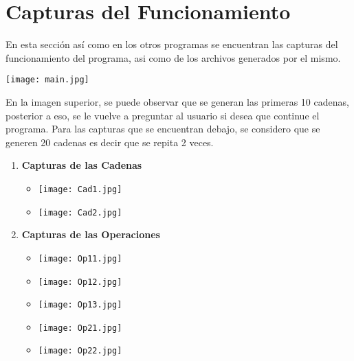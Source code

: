 \documentclass{article}
\begin{document}
	
	\section*{Capturas del Funcionamiento}
	En esta sección así como en los otros programas se encuentran las capturas del funcionamiento del programa, asi como de los archivos generados por el mismo.	
	\item \texttt{[image: main.jpg]}
	
	En la imagen superior, se puede observar que se generan las primeras 10 cadenas, posterior a eso, se le vuelve a preguntar al usuario si desea que continue el programa. Para las capturas que se encuentran debajo, se considero que se generen 20 cadenas es decir que se repita 2 veces.
	\begin{enumerate}
		\item \textbf{Capturas de las Cadenas}
		\begin{itemize}
			\item \texttt{[image: Cad1.jpg]}
			\item \texttt{[image: Cad2.jpg]}
		\end{itemize}				
		\item \textbf{Capturas de las Operaciones}
		\begin{itemize}
			\item \texttt{[image: Op11.jpg]}
			\item \texttt{[image: Op12.jpg]}
			\item \texttt{[image: Op13.jpg]}
			\item \texttt{[image: Op21.jpg]}
			\item \texttt{[image: Op22.jpg]}
		\end{itemize}
		
		
	\end{enumerate}
	
\end{document}
